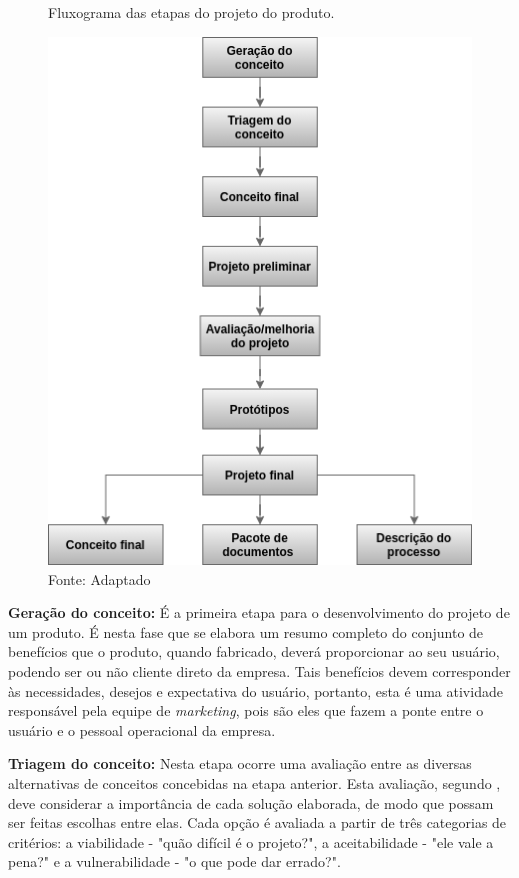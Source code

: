 \begin{figure}[H]
  \centering
  \caption{Fluxograma das etapas do projeto do produto.}
  \includegraphics[width=1\textwidth]{images/projeto_produto.png}
  \caption*{Fonte: Adaptado \cite{slack2006administracao} }
  \label{fig:projeto_produto}
\end{figure}

\textbf{Geração do conceito:} É a primeira etapa para o desenvolvimento do projeto de um produto. É nesta fase que se elabora um resumo completo do conjunto de benefícios que o produto, quando fabricado, deverá proporcionar ao seu usuário, podendo ser ou não cliente direto da empresa. Tais benefícios devem corresponder às necessidades, desejos e expectativa do usuário, portanto, esta é uma atividade responsável pela equipe de \textit{marketing}, pois são eles que fazem a ponte entre o usuário e o pessoal operacional da empresa.  

\textbf{Triagem do conceito:} Nesta etapa ocorre uma avaliação entre as diversas alternativas de conceitos concebidas na etapa anterior. Esta avaliação, segundo \cite{slack2006administracao}, deve considerar a importância de cada solução elaborada, de modo que possam ser feitas escolhas entre elas. Cada opção é avaliada a partir de três categorias de critérios: a viabilidade - "quão difícil é o projeto?", a aceitabilidade - "ele vale a pena?" e a vulnerabilidade - "o que pode dar errado?".

